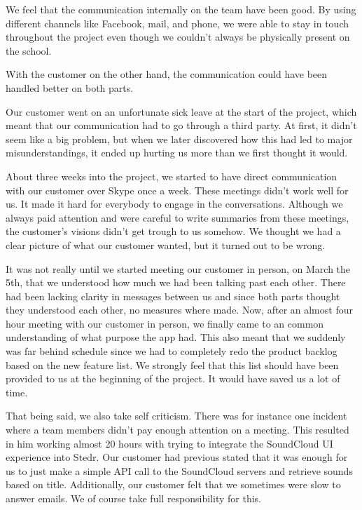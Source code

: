 We feel that the communication internally on the team have been good. By using different channels like Facebook, mail, and phone, we were able to stay in touch throughout the project even though we couldn't always be physically present on the school.

With the customer on the other hand, the communication could have been handled better on both parts. 

Our customer went on an unfortunate sick leave at the start of the project, which meant that our communication had to go through a third party. At first, it didn't seem like a big problem, but when we later discovered how this had led to major misunderstandings, it ended up hurting us more than we first thought it would.

About three weeks into the project, we started to have direct communication with our customer over Skype once a week. These meetings didn't work well for us. It made it hard for everybody to engage in the conversations. Although we always paid attention and were careful to write summaries from these meetings, the customer's visions didn't get trough to us somehow. We thought we had a clear picture of what our customer wanted, but it turned out to be wrong.

It was not really until we started meeting our customer in person, on March the 5th, that we understood how much we had been talking past each other. There had been lacking clarity in messages between us and since both parts thought they understood each other, no measures where made. Now, after an almost four hour meeting with our customer in person, we finally came to an common understanding of what purpose the app had. This also meant that we suddenly was far behind schedule since we had to completely redo the product backlog based on the new feature list. We strongly feel that this list should have been provided to us at the beginning of the project. It would have saved us a lot of time.

That being said, we also take self criticism. There was for instance one incident where a team members didn't pay enough attention on a meeting. This resulted in him working almost 20 hours with trying to integrate the SoundCloud UI experience into Stedr. Our customer had previous stated that it was enough for us to just make a simple API call to the SoundCloud servers and retrieve sounds based on title. Additionally, our customer felt that we sometimes were slow to answer emails. We of course take full responsibility for this. 


